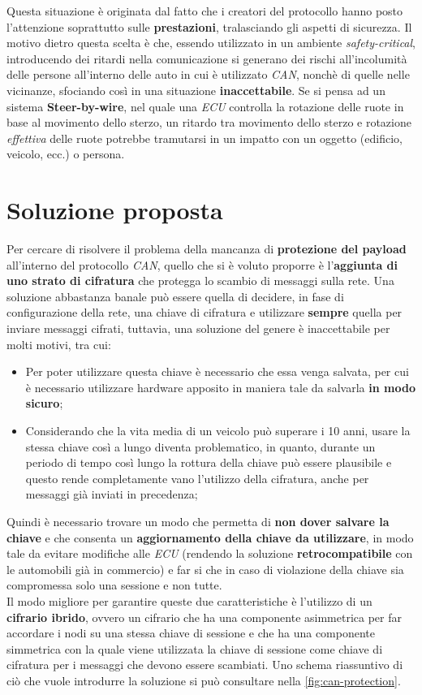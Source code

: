 Questa situazione è originata dal fatto che i creatori del protocollo hanno posto l'attenzione soprattutto sulle \textbf{prestazioni}, tralasciando gli aspetti di sicurezza. Il motivo dietro questa scelta è che, essendo utilizzato in un ambiente \emph{safety-critical}, introducendo dei ritardi nella comunicazione si generano dei rischi all'incolumità delle persone all'interno delle auto in cui è utilizzato \emph{CAN}, nonchè di quelle nelle vicinanze, sfociando così in una situazione \textbf{inaccettabile}. Se si pensa ad un sistema \textbf{Steer-by-wire}, nel quale una \emph{ECU} controlla la rotazione delle ruote in base al movimento dello sterzo, un ritardo tra movimento dello sterzo e rotazione \emph{effettiva} delle ruote potrebbe tramutarsi in un impatto con un oggetto (edificio, veicolo, ecc.) o persona.

\section{Soluzione proposta}
Per cercare di risolvere il problema della mancanza di \textbf{protezione del payload} all'interno del protocollo \emph{CAN}, quello che si è voluto proporre è l'\textbf{aggiunta di uno strato di cifratura} che protegga lo scambio di messaggi sulla rete. Una soluzione abbastanza banale può essere quella di decidere, in fase di configurazione della rete, una chiave di cifratura e utilizzare \textbf{sempre} quella per inviare messaggi cifrati, tuttavia, una soluzione del genere è inaccettabile per molti motivi, tra cui:
\begin{itemize}
    \item Per poter utilizzare questa chiave è necessario che essa venga salvata, per cui è necessario utilizzare hardware apposito in maniera tale da salvarla \textbf{in modo sicuro};
    \item Considerando che la vita media di un veicolo può superare i 10 anni, usare la stessa chiave così a lungo diventa problematico, in quanto, durante un periodo di tempo così lungo la rottura della chiave può essere plausibile e questo rende completamente vano l'utilizzo della cifratura, anche per messaggi già inviati in precedenza;
\end{itemize}

Quindi è necessario trovare un modo che permetta di \textbf{non dover salvare la chiave} e che consenta un \textbf{aggiornamento della chiave da utilizzare}, in modo tale da evitare modifiche alle \emph{ECU} (rendendo la soluzione \textbf{retrocompatibile} con le automobili già in commercio) e far si che in caso di violazione della chiave sia compromessa solo una sessione e non tutte.\\
Il modo migliore per garantire queste due caratteristiche è l'utilizzo di un \textbf{cifrario ibrido}, ovvero un cifrario che ha una componente asimmetrica per far accordare i nodi su una stessa chiave di sessione e che ha una componente simmetrica con la quale viene utilizzata la chiave di sessione come chiave di cifratura per i messaggi che devono essere scambiati. Uno schema riassuntivo di ciò che vuole introdurre la soluzione si può consultare nella \autoref{fig:can-protection}.

